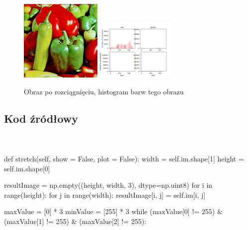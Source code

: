 \documentclass[final,a4paper,openany,12pt]{mwbk}
\begin{document}
\begin{figure}[H]
	\begin{center}
		\includegraphics[width=0.35\textwidth]{peppers_color_stretchHist_result}
		\includegraphics[width=0.35\textwidth]{peppers_color_stretchHist_histogram}
	\end{center}
	\caption{Obraz po rozciągnięciu, histogram barw tego obrazu}
\end{figure}

\subsection*{Kod źródłowy}
\hfill
\\\\
\noindent def stretch(self, show = False, plot = False): \newline
\indent width = self.im.shape[1] \newline
\indent height = self.im.shape[0] \newline

resultImage = np.empty((height, width, 3), dtype=np.uint8) \newline
\indent for i in range(height): \newline
\indent for j in range(width): \newline
\indent resultImage[i, j] = self.im[i, j] \newline


maxValue = [0] * 3 \newline
\indent minValue = [255] * 3 \newline
\indent while (maxValue[0] != 255) $\&$ (maxValue[1] != 255) $\&$ (maxValue[2] != 255): \newline
\end{document}
